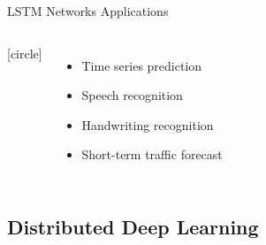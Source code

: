 \begin{frame}{LSTM Networks Applications}
    \begin{columns}
        [circle]
        \begin{itemize}
            \item{Time series prediction}
            \vspace{0.5cm}
            \item{Speech recognition}
            \vspace{0.5cm}
            \item{Handwriting recognition}
            \vspace{0.5cm}
            \item{Short-term traffic forecast}
        \end{itemize}
        \begin{figure}
            \label{fig:apps}
        \end{figure}
    \end{columns}
\end{frame}

\subsection{Distributed Deep Learning}\label{subsec:distributed-deep-learning}

